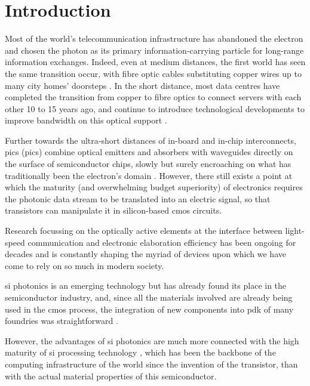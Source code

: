\chapter{Introduction}
\label{chap:introduction}

Most of the world's telecommunication infrastructure has abandoned the electron and chosen the photon as its primary information-carrying particle for long-range information exchanges. Indeed, even at medium distances, the first world has seen the same transition occur, with fibre optic cables substituting copper wires up to many city homes' doorsteps \cite{ECBroadband, ETNOBroadband}. In the short distance, most data centres have completed the transition from copper to fibre optics to connect servers with each other \num{10} to \num{15} years ago, and continue to introduce technological developments to improve bandwidth on this optical support \cite{Cheng2018}. 

Further towards the ultra-short distances of in-board and in-chip interconnects, \acl{pic}s (\acs{pic}s) combine optical emitters and absorbers with waveguides directly on the surface of semiconductor chips, slowly but surely encroaching on what has traditionally been the electron's domain \cite{Shekhar2024, Margalit2021, Smit2019}. However, there still exists a point at which the maturity (and overwhelming budget superiority) of electronics requires the photonic data stream to be translated into an electric signal, so that transistors can manipulate it in silicon-based \acf{cmos} circuits. 

Research focussing on the optically active elements at the interface between light-speed communication and electronic elaboration efficiency has been ongoing for decades \cite{Soref1987} and is constantly shaping the myriad of devices upon which we have come to rely on so much in modern society.

\Acl{si} photonics is an emerging technology but has already found its place in the semiconductor industry, and, since all the materials involved are already being used in the \acs{cmos} process, the integration of new components into \acf{pdk} of many foundries was straightforward \cite{Shi2022, Novack2014}.

However, the advantages of \acl{si} photonics are much more connected with the high maturity of \acl{si} processing technology \cite{Novack2014}, which has been the backbone of the computing infrastructure of the world since the invention of the transistor, than with the actual material properties of this semiconductor.


